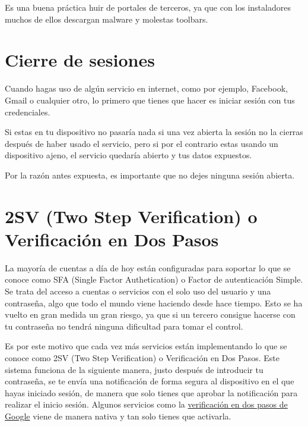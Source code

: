 \documentclass[
  spanish,
  a4paper,
  openany]{book}
\begin{document}
Es una buena práctica huir de portales de terceros, ya que con los instaladores muchos de ellos descargan malware y molestas toolbars.

\hypertarget{cierre-de-sesiones}{%
\section{Cierre de sesiones}\label{cierre-de-sesiones}}

Cuando hagas uso de algún servicio en internet, como por ejemplo, Facebook, Gmail o cualquier otro, lo primero que tienes que hacer es iniciar sesión con tus credenciales.

Si estas en tu dispositivo no pasaría nada si una vez abierta la sesión no la cierras después de haber usado el servicio, pero si por el contrario estas usando un dispositivo ajeno, el servicio quedaría abierto y tus datos expuestos.

Por la razón antes expuesta, es importante que no dejes ninguna sesión abierta.

\hypertarget{sv-two-step-verification-o-verificaciuxf3n-en-dos-pasos}{%
\section{2SV (Two Step Verification) o Verificación en Dos Pasos}\label{sv-two-step-verification-o-verificaciuxf3n-en-dos-pasos}}

La mayoría de cuentas a día de hoy están configuradas para soportar lo que se conoce como SFA (Single Factor Authetication) o Factor de autenticación Simple. Se trata del acceso a cuentas o servicios con el solo uso del usuario y una contraseña, algo que todo el mundo viene haciendo desde hace tiempo. Esto se ha vuelto en gran medida un gran riesgo, ya que si un tercero consigue hacerse con tu contraseña no tendrá ninguna dificultad para tomar el control.

Es por este motivo que cada vez más servicios están implementando lo que se conoce como 2SV (Two Step Verification) o Verificación en Dos Pasos. Este sistema funciona de la siguiente manera, justo después de introducir tu contraseña, se te envía una notificación de forma segura al dispositivo en el que hayas iniciado sesión, de manera que solo tienes que aprobar la notificación para realizar el inicio sesión. Algunos servicios como la \href{https://support.google.com/accounts/answer/185839?co=GENIE.Platform\%3DDesktop\&hl=es}{verificación en dos pasos de Google} viene de manera nativa y tan solo tienes que activarla.
\end{document}
